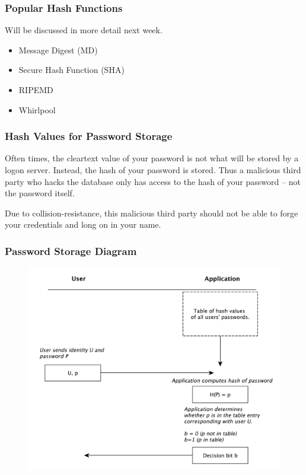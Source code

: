 \documentclass{beamer}
\newcommand{\<}{\langle}
\renewcommand{\>}{\rangle}
\begin{document}
\begin{frame}
\frametitle{Popular Hash Functions}

Will be discussed in more detail next week. 
\begin{itemize}
\item Message Digest (MD)
\item Secure Hash Function (SHA)
\item RIPEMD
\item Whirlpool
\end{itemize}
\end{frame}


\begin{frame}
\frametitle{Hash Values for Password Storage}

Often times, the cleartext value of your password is not what will be stored by a logon server. Instead, the hash of your password is stored. Thus a malicious third party who hacks the database only has access to the hash of your password -- not the password itself. \newline

Due to collision-resistance, this malicious third party should not be able to forge your credentials and long on in your name. 
\end{frame}

\begin{frame}
\frametitle{Password Storage Diagram}

\begin{figure}
\includegraphics[scale=.45]{IMG/pw}
\end{figure}
\end{frame}
\end{document}
